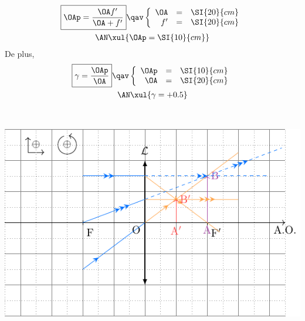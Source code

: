 \documentclass[a4paper, 11pt, garamond, oneside]{book}
\begin{document}
{\begin{enumerate}
\begin{minipage}[t]{.48\linewidth}
			      \begin{gather*}
				      \boxed{\OAp = \frac{\OA f'}{\OA+f'}}
				      \qav
				      \left\{
				      \begin{array}{rcl}
					      \OA & = & \SI{20}{cm}
					      \\
					      f'  & = & \SI{20}{cm}
				      \end{array}
				      \right.\\
				      \AN
				      \xul{
					      \OAp = \SI{10}{cm}
				      }
			      \end{gather*}
			      De plus,
			      \begin{gather*}
				      \boxed{\gamma = \frac{\OAp}{\OA}}
				      \qav
				      \left\{
				      \begin{array}{rcl}
					      \OAp & = & \SI{10}{cm}
					      \\
					      \OA  & = & \SI{20}{cm}
				      \end{array}
				      \right.\\
				      \AN
				      \xul{
					      \gamma = +0.5
				      }
			      \end{gather*}
		      \end{minipage}
		      \hfill
		      \begin{minipage}[t]{.48\linewidth}
			      ~
			      \begin{center}
				      \includegraphics[width=\linewidth]{convDF}
			      \end{center}
		      \end{minipage}
	\end{enumerate}
}
\end{document}
